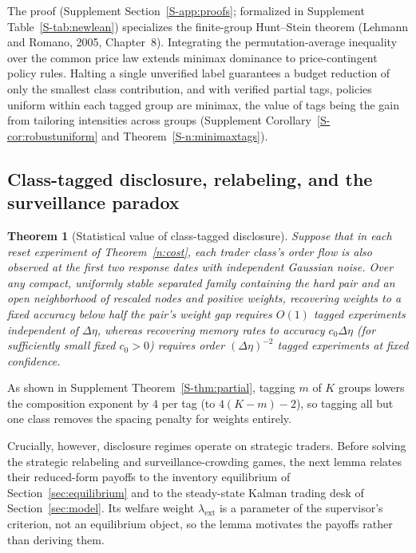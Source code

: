 \documentclass[11pt,letterpaper]{article}
\newtheorem{theorem}{Theorem}[section]
\theoremstyle{definition}
\begin{document}
The proof (Supplement Section~\ref{S-app:proofs}; formalized in Supplement Table~\ref{S-tab:newlean}) specializes the finite-group Hunt--Stein theorem (Lehmann and Romano, 2005, Chapter~8). Integrating the permutation-average inequality over the common price law extends minimax dominance to price-contingent policy rules. Halting a single unverified label guarantees a budget reduction of only the smallest class contribution, and with verified partial tags, policies uniform within each tagged group are minimax, the value of tags being the gain from tailoring intensities across groups (Supplement Corollary~\ref{S-cor:robustuniform} and Theorem~\ref{S-n:minimaxtags}).

\subsection{Class-tagged disclosure, relabeling, and the surveillance paradox}

\begin{theorem}[Statistical value of class-tagged disclosure]\label{n:disc}
Suppose that in each reset experiment of Theorem~\ref{n:cost}, each trader class's order flow is also observed at the first two response dates with independent Gaussian noise. Over any compact, uniformly stable separated family containing the hard pair and an open neighborhood of rescaled nodes and positive weights, recovering weights to a fixed accuracy below half the pair's weight gap requires $O(1)$ tagged experiments independent of $\Delta\eta$, whereas recovering memory rates to accuracy $c_0\Delta\eta$ (for sufficiently small fixed $c_0>0$) requires order $(\Delta\eta)^{-2}$ tagged experiments at fixed confidence.
\end{theorem}

As shown in Supplement Theorem~\ref{S-thm:partial}, tagging $m$ of $K$ groups lowers the composition exponent by $4$ per tag (to $4(K-m)-2$), so tagging all but one class removes the spacing penalty for weights entirely.

Crucially, however, disclosure regimes operate on strategic traders. Before solving the strategic relabeling and surveillance-crowding games, the next lemma relates their reduced-form payoffs to the inventory equilibrium of Section~\ref{sec:equilibrium} and to the steady-state Kalman trading desk of Section~\ref{sec:model}. Its welfare weight $\lambda_{\mathrm{ext}}$ is a parameter of the supervisor's criterion, not an equilibrium object, so the lemma motivates the payoffs rather than deriving them.
\end{document}
